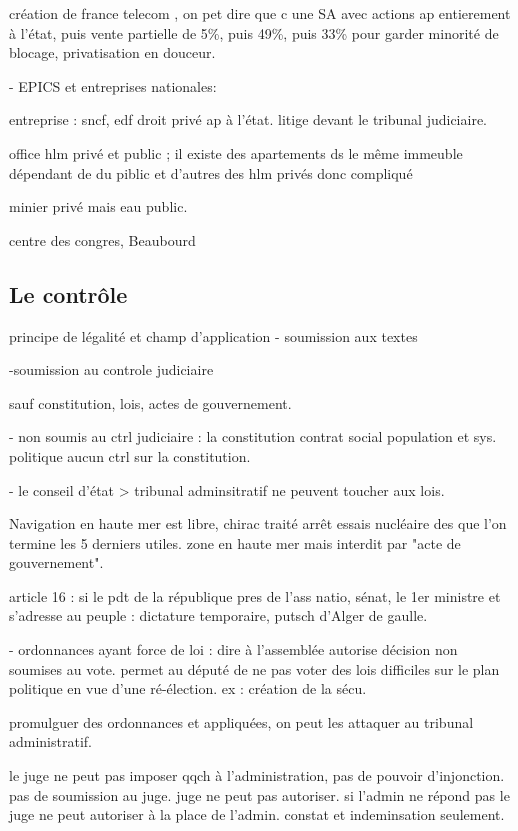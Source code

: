 \documentclass[a4paper,12pt]{article}
\begin{document}
création de france telecom , on pet dire que c une SA avec actions ap entierement à l'état, puis vente partielle de
5\%, puis 49\%, puis 33\% pour garder minorité de blocage, privatisation en douceur.


- EPICS et entreprises nationales:

entreprise : sncf, edf droit privé ap à l'état. litige devant le tribunal judiciaire.

office hlm privé et public ; il existe des apartements ds le même immeuble dépendant de du piblic et d'autres des hlm privés donc compliqué

minier privé mais eau public.

centre des congres, Beaubourd 




\subsection{Le contrôle}

principe de légalité et champ d'application
- soumission aux textes

-soumission au controle judiciaire

sauf constitution, lois, actes de gouvernement.

- non soumis au ctrl judiciaire : la constitution contrat social population et sys. politique
aucun ctrl sur la constitution.

- le conseil d'état > tribunal adminsitratif ne peuvent toucher aux lois.


Navigation en haute mer est libre, chirac traité arrêt essais nucléaire des que l'on termine les 5 derniers utiles.
zone en haute mer mais interdit par "acte de gouvernement".

article 16 : si le pdt de la république pres de l'ass natio, sénat, le 1er ministre et s'adresse au peuple : dictature temporaire, putsch d'Alger de gaulle.


- ordonnances ayant force de loi : dire à l'assemblée autorise décision non soumises au vote.
permet au député de ne pas voter des lois difficiles sur le plan politique en vue d'une ré-élection.
ex : création de la sécu.

promulguer des ordonnances et appliquées, on peut les attaquer au tribunal administratif.


le juge ne peut pas imposer qqch à l'administration, pas de pouvoir d'injonction. pas de soumission au juge.
juge ne peut pas autoriser. si l'admin ne répond pas le juge ne peut autoriser à la place de l'admin. constat et indeminsation seulement. 
\end{document}
